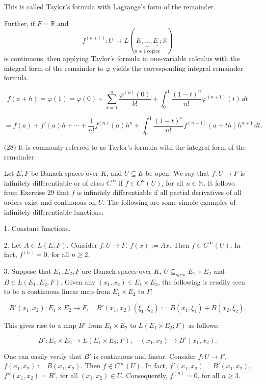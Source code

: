\documentclass{book}
\begin{document}
This is called Taylor's formula with Lagrange's form of the remainder.

\medskip

Further, if $F=\mathbb{R}$ and
\[
f^{(n+1)} : U \to L(\underbrace{E,\dots,E}_{n+1\ \text{copies}};\mathbb{R})
\]
is continuous, then applying Taylor's formula in one-variable calculus
with the integral form of the remainder to $\varphi$ yields the
corresponding integral remainder formula.

\[
f(a + h) = \varphi(1) = \varphi(0) + \sum_{k=1}^{n} \frac{\varphi^{(k)}(0)}{k!} + \int_{0}^{1} \frac{(1 - t)^n}{n!} \varphi^{(n+1)}(t) \, dt
\tag{28}
\]

\[
= f(a) + f'(a)h + \cdots + \frac{1}{n!} f^{(n)}(a)h^n + \int_{0}^{1} \frac{(1 - t)^n}{n!} f^{(n+1)}(a + th)h^{n+1} \, dt.
\]

(28) It is commonly referred to as Taylor's formula with the integral form of the remainder.

Let $E, F$ be Banach spaces over $K$, and $U \subseteq E$ be open. We say that $f : U \to F$ is infinitely differentiable or of class $C^{\infty}$ if $f \in C^n(U)$, for all $n \in \mathbb{N}$. It follows from Exercise 29 that $f$ is infinitely differentiable if all partial derivatives of all orders exist and continuous on $U$. The following are some simple examples of infinitely differentiable functions:

1. Constant functions.

2. Let $A \in L(E; F)$. Consider $f : U \to F$, $f(x) := Ax$. Then $f \in C^{\infty}(U)$. In fact, $f^{(n)} = 0$, for all $n \geq 2$.

3. Suppose that $E_1, E_2, F$ are Banach spaces over $K$, $U \subseteq_{open} E_1 \times E_2$ and $B \in L(E_1, E_2; F)$. Given any $(x_1, x_2) \in E_1 \times E_2$, the following is readily seen to be a continuous linear map from $E_1 \times E_2$ to $F$:

\[
B'(x_1, x_2) : E_1 \times E_2 \to F, \quad B'(x_1, x_2)(\xi_1, \xi_2) := B(x_1, \xi_1) + B(x_2, \xi_2).
\]

This gives rise to a map $B'$ from $E_1 \times E_2$ to $L(E_1 \times E_2; F)$ as follows:

\[
B' : E_1 \times E_2 \to L(E_1 \times E_2; F), \quad (x_1, x_2) \mapsto B'(x_1, x_2).
\]

One can easily verify that $B'$ is continuous and linear. Consider $f : U \to F$, $f(x_1, x_2) := B(x_1, x_2)$. Then $f \in C^{\infty}(U)$. In fact, $f'(x_1, x_2) = B'(x_1, x_2)$, $f''(x_1, x_2) = B'$, for all $(x_1, x_2) \in U$. Consequently, $f^{(n)} = 0$, for all $n \geq 3$.
\end{document}
